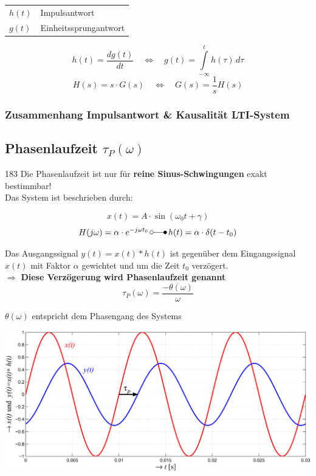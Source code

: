 \begin{tabular}{ll}
    $h(t)$ & Impulsantwort \\
    $g(t)$ & Einheitssprungantwort
\end{tabular}

$$ \boxed{ h(t) =  \frac{dg(t)}{dt}  \quad \Leftrightarrow \quad g(t) = \int\limits_{-\infty}^t  h(\tau) \, d \tau }  $$
$$ \boxed{ H(s) = s \cdot G(s) \quad \Leftrightarrow \quad G(s) =  \frac{1}{s} H(s) }  $$


\subsubsection{Zusammenhang Impulsantwort \& Kausalität LTI-System}



\subsection{Phasenlaufzeit $\tau_P(\omega)$}{183}
Die Phasenlaufzeit ist nur für \textbf{reine Sinus-Schwingungen} exakt bestimmbar! \\
Das System ist beschrieben durch:

$$ x(t) = A \cdot \sin(\omega_0 t + \gamma) $$
$$ H( j \omega) = \alpha \cdot e^{- j \omega t_0} \, \laplace \, h(t) = \alpha \cdot \delta(t - t_0) $$


Das Ausgangssignal $y(t) = x(t) * h(t)$ ist gegenüber dem Eingangssignal $x(t)$ mit Faktor $\alpha$ gewichtet und 
um die Zeit $t_0$ verzögert. \\
$\Rightarrow$ \textbf{Diese Verzögerung wird Phasenlaufzeit genannt}
$$ \boxed{ \tau_P(\omega) = \frac{- \theta(\omega)}{\omega} } $$

$ \theta(\omega)$ entspricht dem Phasengang des Systems 


\includegraphics[width=0.8\linewidth]{images/phasenlaufzeit.png}


